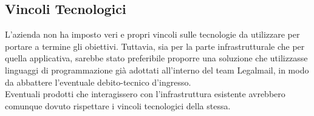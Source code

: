 \subsection{Vincoli Tecnologici}
L'azienda non ha imposto veri e propri vincoli sulle tecnologie da utilizzare per portare a termine gli obiettivi. Tuttavia, sia per la parte infrastrutturale che per quella applicativa, sarebbe stato preferibile proporre una soluzione che utilizzasse linguaggi di programmazione già adottati all'interno del team Legalmail, in modo da abbattere l'eventuale \gls{debito-tecnico} d'ingresso. \\
Eventuali prodotti che interagissero con l'infrastruttura esistente avrebbero comunque dovuto rispettare i vincoli tecnologici della stessa. 
